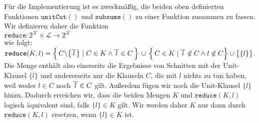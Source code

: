Für die Implementierung ist es zweckmäßig, die beiden oben definierten Funktionen $\texttt{unitCut}()$ und
$\texttt{subsume}()$ zu einer Funktion zusammen zu fassen.  Wir definieren daher die Funktion
\\[0.2cm]
\hspace*{1.3cm}
$\texttt{reduce}: 2^\mathcal{K} \times \mathcal{L} \rightarrow 2^\mathcal{K}$
\\[0.2cm]
wie folgt: 
\\[0.2cm]
\hspace*{1.3cm}
$\texttt{reduce}(K,l)  = 
 \Bigl\{\, C \backslash \bigl\{\overline{\,l\,}\bigr\} \;|\; C \in K \wedge \overline{\,l\,} \in C \,\Bigr\} 
       \,\cup\, \Bigl\{\, C \in K \mid \overline{\,l\,} \not\in C \wedge l \not\in C \Bigr\} \cup \bigl\{\{l\}\bigr\}.
$
\\[0.2cm]
Die Menge enthält also einerseits die Ergebnisse von Schnitten mit
der Unit-Klausel $\{l\}$ und andererseits nur die Klauseln $C$,
die mit $l$ nichts zu tun haben, weil weder $l \in C$ noch $\overline{\,l\,} \in C$
gilt.  Außerdem fügen wir noch die Unit-Klausel $\{l\}$ hinzu.
Dadurch erreichen wir, dass die beiden Mengen $K$ und $\texttt{reduce}(K,l)$
logisch äquivalent sind, falls $\{l\} \in K$ gilt.
Wir werden daher $K$ nur dann durch $\mathtt{reduce}(K, l)$ ersetzen, wenn $\{l\} \in K$ ist.

